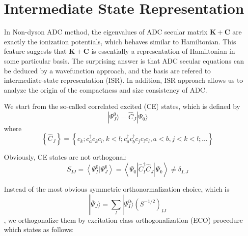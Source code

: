 \section{Intermediate State Representation}

In Non-dyson ADC method, the eigenvalues of ADC secular matrix $\boldsymbol{K}+\boldsymbol{C}$ are exactly the ionization potentials, which behaves similar to Hamiltonian.
This feature suggests that $\boldsymbol{K}+\boldsymbol{C}$ is essentially a representation of Hamiltonian in some particular basis.
The surprising answer is that ADC secular equations can be deduced by a wavefunction approach, and the basis are refered to intermediate-state representation (ISR).
In addition, ISR approach allows us to analyze the origin of the compactness and size consistency of ADC.

We start from the so-called correlated excited (CE) states, which is defined by
\begin{equation}
	| \Psi_{J}^{0} \rangle=\hat{C}_{J} | \Psi_{0} \rangle
\end{equation}
where
\begin{equation}
	\left\{\hat{C}_{J}\right\}=\left\{c_{k} ; c_{a}^{\dagger} c_{k} c_{l}, k<l ; c_{a}^{\dagger} c_{b}^{\dagger} c_{j} c_{l} c_{l}, a<b, j<k<l ; \ldots\right\}
\end{equation}

Obviously, CE states are not orthogonal:
\begin{equation}
	S_{I J}=\left\langle\Psi_{I}^{0} | \Psi_{J}^{0}\right\rangle=\left\langle\Psi_{0}\left|\hat{C}_{I}^{\dagger} \hat{C}_{J}\right| \Psi_{0}\right\rangle \neq \delta_{I, J}
\end{equation}

Instead of the most obvious symmetric orthonormalization choice, which is 
\begin{equation}
	| \overline{\Psi}_{J} \rangle=\sum_{I} | \Psi_{I}^{0} \rangle\left(S^{-1 / 2}\right)_{I J}
\end{equation}
, we orthogonalize them by excitation class orthogonalization (ECO) procedure which states as follows:

